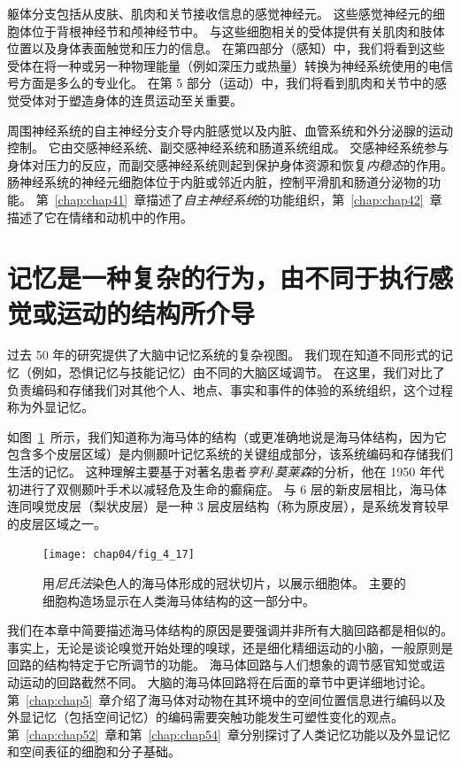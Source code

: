 躯体分支包括从皮肤、肌肉和关节接收信息的感觉神经元。
这些感觉神经元的细胞体位于背根神经节和颅神经节中。 
与这些细胞相关的受体提供有关肌肉和肢体位置以及身体表面触觉和压力的信息。
在第四部分（感知）中，我们将看到这些受体在将一种或另一种物理能量（例如深压力或热量）转换为神经系统使用的电信号方面是多么的专业化。
在第 5 部分（运动）中，我们将看到肌肉和关节中的感觉受体对于塑造身体的连贯运动至关重要。


周围神经系统的自主神经分支介导内脏感觉以及内脏、血管系统和外分泌腺的运动控制。
它由交感神经系统、副交感神经系统和肠道系统组成。 
交感神经系统参与身体对压力的反应，而副交感神经系统则起到保护身体资源和恢复\textit{内稳态}的作用。
肠神经系统的神经元细胞体位于内脏或邻近内脏，控制平滑肌和肠道分泌物的功能。
第~\ref{chap:chap41}~章描述了\textit{自主神经系统}的功能组织，第~\ref{chap:chap42}~章描述了它在情绪和动机中的作用。



\section{记忆是一种复杂的行为，由不同于执行感觉或运动的结构所介导}

过去 50 年的研究提供了大脑中记忆系统的复杂视图。 
我们现在知道不同形式的记忆（例如，恐惧记忆与技能记忆）由不同的大脑区域调节。
在这里，我们对比了负责编码和存储我们对其他个人、地点、事实和事件的体验的系统组织，这个过程称为外显记忆。


如图~\ref{fig:4_17}~所示，我们知道称为海马体的结构（或更准确地说是海马体结构，因为它包含多个皮层区域）是内侧颞叶记忆系统的关键组成部分，该系统编码和存储我们生活的记忆。 
这种理解主要基于对著名患者\textit{亨利$\cdot$莫莱森}的分析，他在 1950 年代初进行了双侧颞叶手术以减轻危及生命的癫痫症。
与 6 层的新皮层相比，海马体连同嗅觉皮层（梨状皮层）是一种 3 层皮层结构（称为原皮层），是系统发育较早的皮层区域之一。


\begin{figure}[htbp]
	\centering
	\texttt{[image: chap04/fig\_4\_17]}
	\caption{用\textit{尼氏法}染色人的海马体形成的冠状切片，以展示细胞体。
		主要的细胞构造场显示在人类海马体结构的这一部分中。}
	\label{fig:4_17}
\end{figure}


我们在本章中简要描述海马体结构的原因是要强调并非所有大脑回路都是相似的。
事实上，无论是谈论嗅觉开始处理的嗅球，还是细化精细运动的小脑，一般原则是回路的结构特定于它所调节的功能。
海马体回路与人们想象的调节感官知觉或运动运动的回路截然不同。
大脑的海马体回路将在后面的章节中更详细地讨论。 
第~\ref{chap:chap5}~章介绍了海马体对动物在其环境中的空间位置信息进行编码以及外显记忆（包括空间记忆）的编码需要突触功能发生可塑性变化的观点。 
第~\ref{chap:chap52}~章和第~\ref{chap:chap54}~章分别探讨了人类记忆功能以及外显记忆和空间表征的细胞和分子基础。



